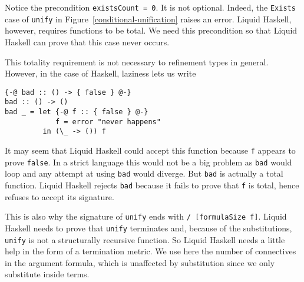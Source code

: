 \documentclass[sigconf, review]{acmart}
\newcommand{\tc}[1]{{\small\texttt{#1}}}
\begin{document}
Notice the precondition \tc{existsCount = 0}. It is not optional. Indeed, the
\tc{Exists} case of \tc{unify} in Figure~\ref{conditional-unification} raises an
error. Liquid Haskell, however, requires functions to be total. We need this
precondition so that Liquid Haskell can prove that this case never occurs.

This totality requirement is not necessary to refinement types in general.
However, in the case of Haskell, laziness lets us write
\begin{verbatim}
{-@ bad :: () -> { false } @-}
bad :: () -> ()
bad _ = let {-@ f :: { false } @-}
            f = error "never happens"
         in (\_ -> ()) f
\end{verbatim}
It may seem that Liquid Haskell could accept this function because \tc{f} appears
to prove \tc{false}. In a strict language this would not be a big problem as
\tc{bad} would loop and any attempt at using \tc{bad} would diverge. But \tc{bad} is
actually a total function. Liquid Haskell rejects \tc{bad} because it fails to
prove that \tc{f} is total, hence refuses to accept its signature.

This is also why the signature of \tc{unify} ends with \tc{/ [formulaSize f]}.
Liquid Haskell needs to prove that \tc{unify} terminates and, because of the
substitutions, \tc{unify} is not a structurally recursive function. So Liquid
Haskell needs a little help in the form of a termination metric. We use here
the number of connectives in the argument formula, which is unaffected by
substitution since we only substitute inside terms.


\end{document}
